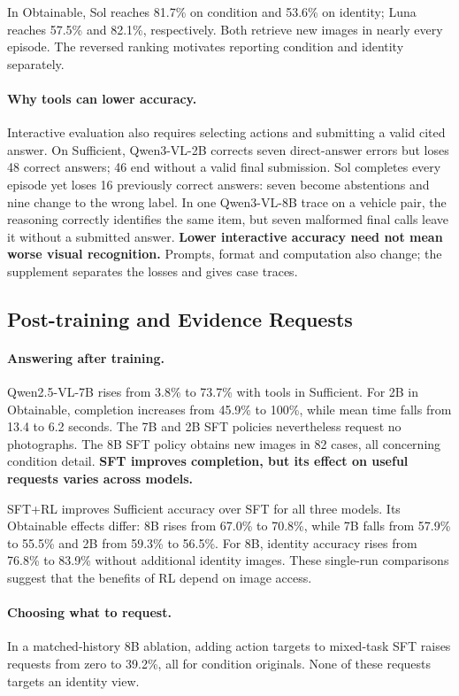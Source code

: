 \documentclass[10pt,twocolumn,letterpaper]{article}
\begin{document}
In Obtainable, Sol reaches 81.7\% on condition and 53.6\% on identity; Luna reaches 57.5\% and 82.1\%, respectively.
Both retrieve new images in nearly every episode.
The reversed ranking motivates reporting condition and identity separately.

\paragraph{Why tools can lower accuracy.}
Interactive evaluation also requires selecting actions and submitting a valid cited answer.
On Sufficient, Qwen3-VL-2B corrects seven direct-answer errors but loses 48 correct answers; 46 end without a valid final submission.
Sol completes every episode yet loses 16 previously correct answers: seven become abstentions and nine change to the wrong label.
In one Qwen3-VL-8B trace on a vehicle pair, the reasoning correctly identifies the same item, but seven malformed final calls leave it without a submitted answer.
\textbf{Lower interactive accuracy need not mean worse visual recognition.}
Prompts, format and computation also change; the supplement separates the losses and gives case traces.

\subsection{Post-training and Evidence Requests}
\label{sec:sft}
\paragraph{Answering after training.}
Qwen2.5-VL-7B rises from 3.8\% to 73.7\% with tools in Sufficient.
For 2B in Obtainable, completion increases from 45.9\% to 100\%, while mean time falls from 13.4 to 6.2 seconds.
The 7B and 2B SFT policies nevertheless request no photographs.
The 8B SFT policy obtains new images in 82 cases, all concerning condition detail.
\textbf{SFT improves completion, but its effect on useful requests varies across models.}

SFT+RL improves Sufficient accuracy over SFT for all three models.
Its Obtainable effects differ: 8B rises from 67.0\% to 70.8\%, while 7B falls from 57.9\% to 55.5\% and 2B from 59.3\% to 56.5\%.
For 8B, identity accuracy rises from 76.8\% to 83.9\% without additional identity images.
These single-run comparisons suggest that the benefits of RL depend on image access.

\paragraph{Choosing what to request.}
In a matched-history 8B ablation, adding action targets to mixed-task SFT raises requests from zero to 39.2\%, all for condition originals.
None of these requests targets an identity view.
\end{document}
